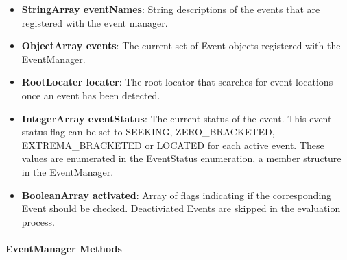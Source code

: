 \begin{itemize}
\item \textbf{StringArray eventNames}:  String descriptions of the events that are registered with the event manager.
\item \textbf{ObjectArray events}:  The current set of Event objects registered with the EventManager.
\item \textbf{RootLocater locater}:  The root locator that searches for event locations once an event has been detected.
\item \textbf{IntegerArray eventStatus}:  The current status of the event.  This event status flag can be set to SEEKING, ZERO\_BRACKETED, EXTREMA\_BRACKETED or LOCATED for each active event.  These values are enumerated in the EventStatus enumeration, a member structure in the EventManager.
\item \textbf{BooleanArray activated}:  Array of flags indicating if the corresponding Event should be checked.  Deactiviated Events are skipped in the evaluation process.
\end{itemize}


\paragraph{EventManager Methods}

